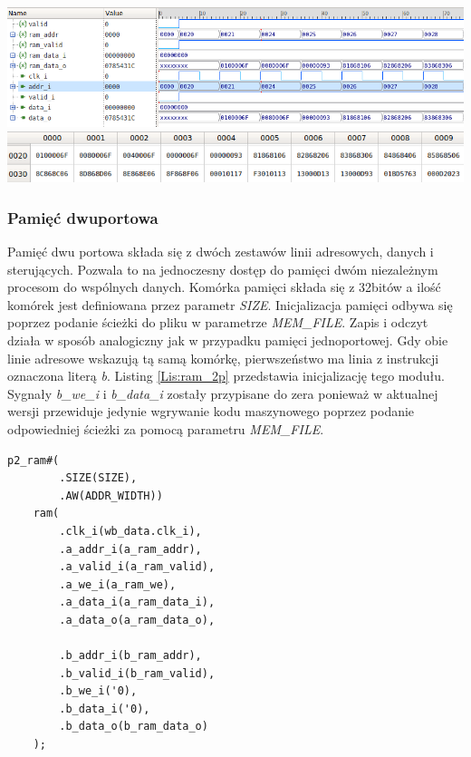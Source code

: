 \documentclass[11pt,a4paper]{article}
\begin{document}
					\begin{minipage}[c]{\textwidth}
					\includegraphics[width=15cm]{./rysunki/ram_sim.png}
					\includegraphics[width=15cm]{./rysunki/pamiec_ram.png}
			\end{minipage} 
			
		\subsubsection{Pamięć dwuportowa}
			\hspace{5mm}
			Pamięć dwu portowa składa się z dwóch zestawów linii adresowych, danych i sterujących. Pozwala to na jednoczesny dostęp do pamięci dwóm niezależnym procesom do wspólnych danych. Komórka pamięci składa się z 32bitów a ilość komórek jest definiowana przez parametr \textit{SIZE}. Inicjalizacja pamięci odbywa się poprzez podanie ścieżki do pliku w parametrze \textit{MEM\_FILE}. Zapis i odczyt działa w sposób analogiczny jak w przypadku pamięci jednoportowej. Gdy obie linie adresowe wskazują tą samą komórkę, pierwszeństwo ma linia z instrukcji oznaczona literą \textit{b}. Listing \ref{Lis:ram_2p} przedstawia inicjalizację tego modułu. Sygnały \textit{b\_we\_i} i \textit{b\_data\_i} zostały przypisane do zera ponieważ w aktualnej wersji przewiduje jedynie wgrywanie kodu maszynowego poprzez podanie odpowiedniej ścieżki za pomocą parametru \textit{MEM\_FILE}.\\
						\begin{minipage}{\textwidth}
\begin{scriptsize}
\begin{lstlisting}[label=Lis:ram_2p,caption=Model pamięci RAM]
    p2_ram#(
        .SIZE(SIZE),
        .AW(ADDR_WIDTH))
    ram(
        .clk_i(wb_data.clk_i),
        .a_addr_i(a_ram_addr),
        .a_valid_i(a_ram_valid),
        .a_we_i(a_ram_we),
        .a_data_i(a_ram_data_i),
        .a_data_o(a_ram_data_o),
		
        .b_addr_i(b_ram_addr),
        .b_valid_i(b_ram_valid),
        .b_we_i('0),
        .b_data_i('0),
        .b_data_o(b_ram_data_o)
    );
\end{lstlisting}
\end{scriptsize}
\end{minipage}
\end{document}
